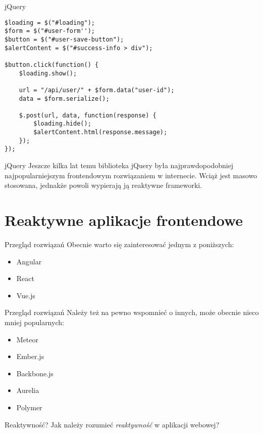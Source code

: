 \begin{frame}[fragile]{jQuery}
	\begin{lstlisting}
$loading = $("#loading");
$form = $("#user-form'');
$button = $("#user-save-button");
$alertContent = $("#success-info > div");

$button.click(function() {
    $loading.show();

    url = "/api/user/" + $form.data("user-id");
    data = $form.serialize();
    
    $.post(url, data, function(response) {
        $loading.hide();
        $alertContent.html(response.message);
    });
});
	\end{lstlisting}
\end{frame}

\begin{frame}{jQuery}
	Jeszcze kilka lat temu biblioteka jQuery była najprawdopodobniej najpopularniejszym frontendowym rozwiązaniem w internecie. Wciąż jest masowo stosowana, jednakże powoli wypierają ją reaktywne frameworki.
\end{frame}

\section{Reaktywne aplikacje frontendowe}

\begin{frame}{Przegląd rozwiązań}
	Obecnie warto się zainteresować jednym z poniższych:
	\begin{itemize}
	\item Angular
	\item React
	\item Vue.js
	\end{itemize}
\end{frame}

\begin{frame}{Przegląd rozwiązań}
	Należy też na pewno wspomnieć o innych, może obecnie nieco mniej popularnych:
	\begin{itemize}
	\item Meteor
	\item Ember.js
	\item Backbone.js
	\item Aurelia
	\item Polymer
	\end{itemize}
\end{frame}

\begin{frame}{Reaktywność?}
	Jak należy rozumieć \emph{reaktywność} w aplikacji webowej?
\end{frame}

